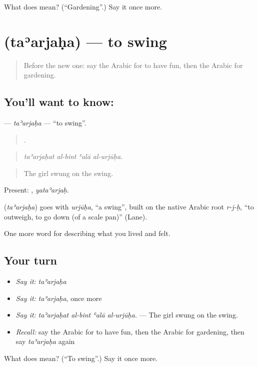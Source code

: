 \begin{tcolorbox}[breakable,colback=teal!4,colframe=teal!35!black,title={Before you move on}]
What does  mean? (\textquotedblleft{}Gardening\textquotedblright{}.) Say it once more.
\end{tcolorbox}
\section[\texorpdfstring{\ar{تأرجح} (taʾarjaḥa)}{تأرجح (taʾarjaḥa)}]{ (taʾarjaḥa) — to swing}

\label{lesson:AR-C539-taarjaha}



\begin{quote}
Before the new one: say the Arabic for to have fun, then the Arabic for gardening.
\end{quote}

\subsection*{You'll want to know: }
\textbf{} — \emph{taʾarjaḥa} — \textquotedblleft{}to swing\textquotedblright{}.

\begin{quote}
   .
\end{quote}

\begin{quote}
\emph{taʾarjaḥat al-bint ʿalā al-urjūḥa.}
\end{quote}

\begin{quote}
The girl swung on the swing.
\end{quote}

Present: , \emph{yataʾarjaḥ}.

\begin{cousinweb}
\textbf{} (\emph{taʾarjaḥa}) goes with \emph{urjūḥa}, \textquotedblleft{}a swing\textquotedblright{}, built on the native Arabic root \emph{r-j-ḥ}, \textquotedblleft{}to outweigh, to go down (of a scale pan)\textquotedblright{} (Lane).
\end{cousinweb}

\begin{grammarlens}[title={What you've built}]
One more word for describing what you lived and felt.
\end{grammarlens}

\subsection*{Your turn}
\begin{itemize}
\raggedright
  \item \emph{Say it:} \emph{taʾarjaḥa}
  \item \emph{Say it:} \emph{taʾarjaḥa}, once more
  \item \emph{Say it:} \emph{taʾarjaḥat al-bint ʿalā al-urjūḥa.} — The girl swung on the swing.
  \item \emph{Recall:} say the Arabic for to have fun, then the Arabic for gardening, then say \emph{taʾarjaḥa} again
\end{itemize}

\begin{tcolorbox}[breakable,colback=teal!4,colframe=teal!35!black,title={Before you move on}]
What does  mean? (\textquotedblleft{}To swing\textquotedblright{}.) Say it once more.
\end{tcolorbox}
